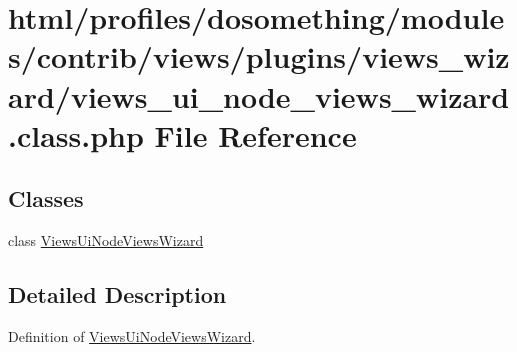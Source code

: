 \hypertarget{views__ui__node__views__wizard_8class_8php}{
\section{html/profiles/dosomething/modules/contrib/views/plugins/views\_\-wizard/views\_\-ui\_\-node\_\-views\_\-wizard.class.php File Reference}
\label{views__ui__node__views__wizard_8class_8php}
}
\subsection*{Classes}
\begin{DoxyCompactItemize}
\item 
class \hyperlink{classViewsUiNodeViewsWizard}{ViewsUiNodeViewsWizard}
\end{DoxyCompactItemize}


\subsection{Detailed Description}
Definition of \hyperlink{classViewsUiNodeViewsWizard}{ViewsUiNodeViewsWizard}. 